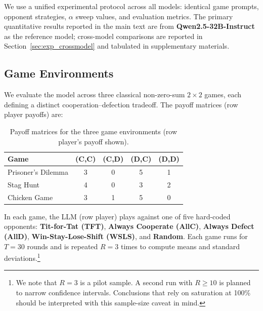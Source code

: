 \documentclass{article}
\begin{document}
We use a unified experimental protocol across all models: identical game prompts, opponent strategies, $\alpha$ sweep values, and evaluation metrics. The primary quantitative results reported in the main text are from \textbf{Qwen2.5-32B-Instruct}~\citep{qwen2025qwen25} as the reference model; cross-model comparisons are reported in Section~\ref{sec:exp_crossmodel} and tabulated in supplementary materials.

\subsection{Game Environments}
\label{sec:games}

We evaluate the model across three classical non-zero-sum $2 \times 2$ games, each defining a distinct cooperation--defection tradeoff. The payoff matrices (row player payoffs) are:

\begin{table}[h]
\centering
\caption{Payoff matrices for the three game environments (row player's payoff shown).}
\label{tab:payoffs}
\small
\begin{tabular}{lcccc}
\toprule
\textbf{Game} & \textbf{(C,C)} & \textbf{(C,D)} & \textbf{(D,C)} & \textbf{(D,D)} \\
\midrule
Prisoner's Dilemma & 3 & 0 & 5 & 1 \\
Stag Hunt & 4 & 0 & 3 & 2 \\
Chicken Game & 3 & 1 & 5 & 0 \\
\bottomrule
\end{tabular}
\end{table}

In each game, the LLM (row player) plays against one of five hard-coded opponents: \textbf{Tit-for-Tat (TFT)}, \textbf{Always Cooperate (AllC)}, \textbf{Always Defect (AllD)}, \textbf{Win-Stay-Lose-Shift (WSLS)}, and \textbf{Random}. Each game runs for $T=30$ rounds and is repeated $R=3$ times to compute means and standard deviations.\footnote{We note that $R=3$ is a pilot sample. A second run with $R \geq 10$ is planned to narrow confidence intervals. Conclusions that rely on saturation at 100\% should be interpreted with this sample-size caveat in mind.}
\end{document}
